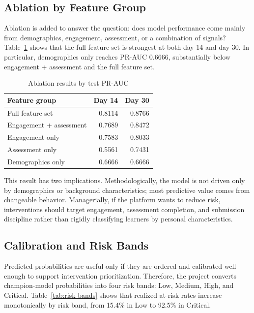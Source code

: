 \documentclass[conference]{IEEEtran}
\begin{document}
\subsection{Ablation by Feature Group}

Ablation is added to answer the question: does model performance come mainly from demographics, engagement, assessment, or a combination of signals? Table~\ref{tab:ablation} shows that the full feature set is strongest at both day 14 and day 30. In particular, demographics only reaches PR-AUC 0.6666, substantially below engagement + assessment and the full feature set.

\begin{table}[H]
\centering
\footnotesize
\caption{Ablation results by test PR-AUC}
\label{tab:ablation}
\begin{tabular}{lrr}
\toprule
Feature group & Day 14 & Day 30 \\
\midrule
Full feature set & 0.8114 & 0.8766 \\
Engagement + assessment & 0.7689 & 0.8472 \\
Engagement only & 0.7583 & 0.8033 \\
Assessment only & 0.5561 & 0.7431 \\
Demographics only & 0.6666 & 0.6666 \\
\bottomrule
\end{tabular}
\end{table}

This result has two implications. Methodologically, the model is not driven only by demographics or background characteristics; most predictive value comes from changeable behavior. Managerially, if the platform wants to reduce risk, interventions should target engagement, assessment completion, and submission discipline rather than rigidly classifying learners by personal characteristics.

\subsection{Calibration and Risk Bands}

Predicted probabilities are useful only if they are ordered and calibrated well enough to support intervention prioritization. Therefore, the project converts champion-model probabilities into four risk bands: Low, Medium, High, and Critical. Table~\ref{tab:risk-bands} shows that realized at-risk rates increase monotonically by risk band, from 15.4\% in Low to 92.5\% in Critical.
\end{document}
